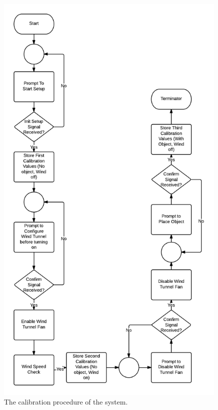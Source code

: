 	\begin{figure}[H]
		\centering
			\includegraphics[scale=0.40]{img/flowchart-calibration}
		\caption{The calibration procedure of the system.}
	\end{figure}
